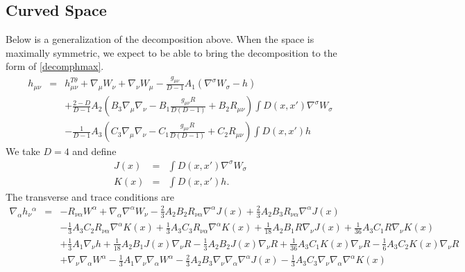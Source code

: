 \documentclass[10pt,letterpaper]{article}
\numberwithin{equation}{section}
\begin{document}
\subsection{Curved Space}
%
%
Below is a generalization of the decomposition above. When the space is maximally symmetric, we expect to be able to bring the decomposition to the form of \eqref{decomphmax}.
\begin{eqnarray}
h_{\mu\nu} &=& h_{\mu\nu}^{T\theta} + \nabla_\mu W_\nu + \nabla_\nu W_\mu - \frac{g_{\mu\nu}}{D-1}A_1(\nabla^\sigma W_\sigma - h)
\nonumber\\
&& +\frac{2-D}{D-1}A_2\left( B_3 \nabla_\mu\nabla_\nu -B_1\frac{ g_{\mu\nu}R}{D(D-1)}+B_2 R_{\mu\nu}\right) \int D(x,x') \nabla^\sigma W_\sigma
\nonumber\\
&&-\frac{1}{D-1}A_3\left( C_3\nabla_\mu\nabla_\nu -C_1\frac{g_{\mu\nu}R}{D(D-1)}+C_2 R_{\mu\nu}\right) \int D(x,x') h
\label{decomph}
\end{eqnarray}
We take $D=4$ and define
\begin{eqnarray}
J(x) &=&  \int D(x,x') \nabla^\sigma W_\sigma
\nonumber\\
K(x)&=&\int D(x,x') h.
\end{eqnarray}
The transverse and trace conditions are
\begin{eqnarray}
\nabla_{\alpha }h_{\nu }{}^{\alpha }&=& - R_{\nu \alpha } W^{\alpha }  + \nabla_{\alpha }\nabla^{\alpha }W_{\nu } -  \tfrac{2}{3} A_{2}{} B_{2}{} R_{\nu \alpha } \nabla^{\alpha }J(x) + \tfrac{2}{3} A_{2}{} B_{3}{} R_{\nu \alpha } \nabla^{\alpha }J(x) \nonumber \\ 
&& -  \tfrac{1}{3} A_{3}{} C_{2}{} R_{\nu \alpha } \nabla^{\alpha }K(x) + \tfrac{1}{3} A_{3}{} C_{3}{} R_{\nu \alpha } \nabla^{\alpha }K(x) + \tfrac{1}{18} A_{2}{} B_{1}{} R \nabla_{\nu }J(x) + \tfrac{1}{36} A_{3}{} C_{1}{} R \nabla_{\nu }K(x) \nonumber \\ 
&& + \tfrac{1}{3} A_{1}{} \nabla_{\nu }h + \tfrac{1}{18} A_{2}{} B_{1}{} J(x) \nabla_{\nu }R -  \tfrac{1}{3} A_{2}{} B_{2}{} J(x) \nabla_{\nu }R + \tfrac{1}{36} A_{3}{} C_{1}{} K(x) \nabla_{\nu }R -  \tfrac{1}{6} A_{3}{} C_{2}{} K(x) \nabla_{\nu }R \nonumber \\ 
&& + \nabla_{\nu }\nabla_{\alpha }W^{\alpha } -  \tfrac{1}{3} A_{1}{} \nabla_{\nu }\nabla_{\alpha }W^{\alpha } -  \tfrac{2}{3} A_{2}{} B_{3}{} \nabla_{\nu }\nabla_{\alpha }\nabla^{\alpha }J(x) -  \tfrac{1}{3} A_{3}{} C_{3}{} \nabla_{\nu }\nabla_{\alpha }\nabla^{\alpha }K(x)
\end{eqnarray}
\end{document}
